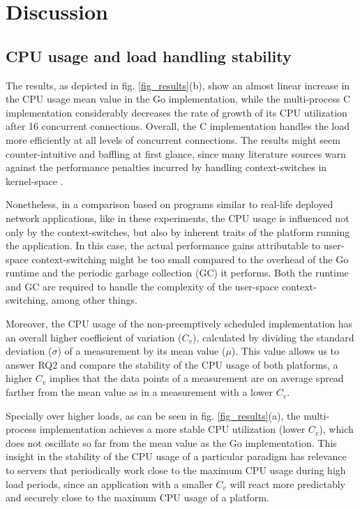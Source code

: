 \section{Discussion}
\subsection{CPU usage and load handling stability}
The results, as depicted in fig. \ref{fig_results}(b), show an almost linear increase in the CPU usage mean value in the Go implementation, while the multi-process C implementation considerably decreases the rate of growth of its CPU utilization after 16 concurrent connections. Overall, the C implementation handles the load more efficiently at all levels of concurrent connections. The results might seem counter-intuitive and baffling at first glance, since many literature sources warn against the performance penalties incurred by handling context-switches in kernel-space \cite{Cox-Buday2017}\cite{Kerrisk2010}. 

Nonetheless, in a comparison based on programs similar to real-life deployed network applications, like in these experiments, the CPU usage is influenced not only by the context-switches, but also by inherent traits of the platform running the application. In this case, the actual performance gains attributable to user-space context-switching might be too small compared to the overhead of the Go runtime and the periodic garbage collection (GC) it performs. Both the runtime and GC are required to handle the complexity of the user-space context-switching, among other things.

Moreover, the CPU usage of the non-preemptively scheduled implementation has an overall higher coefficient of variation ($C_v$), calculated by dividing the standard deviation ($\sigma$) of a measurement by its mean value ($\mu$). This value allows us to answer RQ2 and compare the stability of the CPU usage of both platforms, a higher $C_v$ implies that the data points of a measurement are on average spread farther from the mean value as in a measurement with a lower $C_v$. 

Specially over higher loads, as can be seen in fig. \ref{fig_results}(a), the multi-process implementation achieves a more stable CPU utilization (lower $C_v$), which does not oscillate so far from the mean value as the Go implementation. This insight in the stability of the CPU usage of a particular paradigm has relevance to servers that periodically work close to the maximum CPU usage during high load periods, since an application with a smaller $C_v$ will react more predictably and securely close to the maximum CPU usage of a platform.

